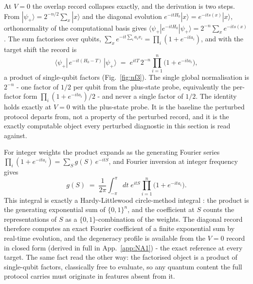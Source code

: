 At $V = 0$ the overlap record collapses exactly, and the derivation is two steps. From $|\psi_+\rangle = 2^{-n/2} \sum_x |x\rangle$ and the diagonal evolution $e^{-i t H_0} |x\rangle = e^{-i t s(x)} |x\rangle$, orthonormality of the computational basis gives $\langle\psi_+| e^{-i t H_0} |\psi_+\rangle = 2^{-n} \sum_x e^{-i t s(x)}$. The sum factorises over qubits, $\sum_x e^{-i t \sum_i a_i x_i} = \prod_i (1 + e^{-i t a_i})$, and with the target shift the record is
\[
\langle\psi_+|\, e^{-i t (H_0 - T)}\, |\psi_+\rangle \;=\; e^{i t T}\, 2^{-n} \prod_{i=1}^{n} \bigl(1 + e^{-i t a_i}\bigr),
\]
a product of single-qubit factors (Fig.~\ref{fig:nf3}). The single global normalisation is $2^{-n}$ - one factor of $1/2$ per qubit from the plus-state probe, equivalently the per-factor form $\prod_i (1 + e^{-i t a_i})/2$ - and never a single factor of $1/2$. The identity holds exactly at $V = 0$ with the plus-state probe. It is the baseline the perturbed protocol departs from, not a property of the perturbed record, and it is the exactly computable object every perturbed diagnostic in this section is read against.

For integer weights the product expands as the generating Fourier series $\prod_i (1 + e^{-i t a_i}) = \sum_S g(S)\, e^{-i t S}$, and Fourier inversion at integer frequency gives
\[
g(S) \;=\; \frac{1}{2\pi} \int_{-\pi}^{\pi} dt\; e^{i t S} \prod_{i=1}^{n} \bigl(1 + e^{-i t a_i}\bigr).
\]
This integral is exactly a Hardy-Littlewood circle-method integral \cite{vaughan1997hardy}: the product is the generating exponential sum of $\{0,1\}^n$, and the coefficient at $S$ counts the representations of $S$ as a $\{0,1\}$-combination of the weights. The diagonal record therefore computes an exact Fourier coefficient of a finite exponential sum by real-time evolution, and the degeneracy profile is available from the $V = 0$ record in closed form (derived in full in App.~\ref{app:NA1}) - the exact reference at every target. The same fact read the other way: the factorised object is a product of single-qubit factors, classically free to evaluate, so any quantum content the full protocol carries must originate in features absent from it.


